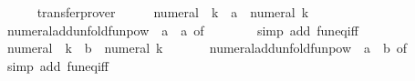 \begin{isabellebody}
\ \ \ \ \isamarkupfalse%
\ transfer{\isacharunderscore}{\kern0pt}prover\isanewline
\ \ \isamarkupfalse%
\ \isamarkupfalse%
\ {\isacartoucheopen}numeral\ {\isacharequal}{\kern0pt}\ {\isacharparenleft}{\kern0pt}{\isasymlambda}k{\isachardot}{\kern0pt}\ {\isacharparenleft}{\kern0pt}{\isacharparenleft}{\kern0pt}{\isacharplus}{\kern0pt}{\isacharparenright}{\kern0pt}\ {\isacharparenleft}{\kern0pt}{}{\isacharcolon}{\kern0pt}{\isacharcolon}{\kern0pt}{\isacharprime}{\kern0pt}a{\isacharparenright}{\kern0pt}\ {\isacharcircum}{\kern0pt}{\isacharcircum}{\kern0pt}\ numeral\ k{\isacharparenright}{\kern0pt}\ {}{\isacharparenright}{\kern0pt}{\isacartoucheclose}\isanewline
\ \ \ \ \isamarkupfalse%
\ numeral{\isacharunderscore}{\kern0pt}add{\isacharunderscore}{\kern0pt}unfold{\isacharunderscore}{\kern0pt}funpow\ {\isacharbrackleft}{\kern0pt}\ {\isacharquery}{\kern0pt}{\isacharprime}{\kern0pt}a\ {\isacharequal}{\kern0pt}\ {\isacharprime}{\kern0pt}a{\isacharcomma}{\kern0pt}\ of\ {\isacharunderscore}{\kern0pt}\ {}{\isacharbrackright}{\kern0pt}\isanewline
\ \ \ \ \isamarkupfalse%
\ {\isacharparenleft}{\kern0pt}simp\ add{\isacharcolon}{\kern0pt}\ fun{\isacharunderscore}{\kern0pt}eq{\isacharunderscore}{\kern0pt}iff{\isacharparenright}{\kern0pt}\isanewline
\ \ \isamarkupfalse%
\ \isamarkupfalse%
\ {\isacartoucheopen}numeral\ {\isacharequal}{\kern0pt}\ {\isacharparenleft}{\kern0pt}{\isasymlambda}k{\isachardot}{\kern0pt}\ {\isacharparenleft}{\kern0pt}{\isacharparenleft}{\kern0pt}{\isacharplus}{\kern0pt}{\isacharparenright}{\kern0pt}\ {\isacharparenleft}{\kern0pt}{}{\isacharcolon}{\kern0pt}{\isacharcolon}{\kern0pt}{\isacharprime}{\kern0pt}b{\isacharparenright}{\kern0pt}\ {\isacharcircum}{\kern0pt}{\isacharcircum}{\kern0pt}\ numeral\ k{\isacharparenright}{\kern0pt}\ {}{\isacharparenright}{\kern0pt}{\isacartoucheclose}\isanewline
\ \ \ \ \isamarkupfalse%
\ numeral{\isacharunderscore}{\kern0pt}add{\isacharunderscore}{\kern0pt}unfold{\isacharunderscore}{\kern0pt}funpow\ {\isacharbrackleft}{\kern0pt}\ {\isacharquery}{\kern0pt}{\isacharprime}{\kern0pt}a\ {\isacharequal}{\kern0pt}\ {\isacharprime}{\kern0pt}b{\isacharcomma}{\kern0pt}\ of\ {\isacharunderscore}{\kern0pt}\ {}{\isacharbrackright}{\kern0pt}\isanewline
\ \ \ \ \isamarkupfalse%
\ {\isacharparenleft}{\kern0pt}simp\ add{\isacharcolon}{\kern0pt}\ fun{\isacharunderscore}{\kern0pt}eq{\isacharunderscore}{\kern0pt}iff{\isacharparenright}{\kern0pt}\isanewline

\end{isabellebody}
